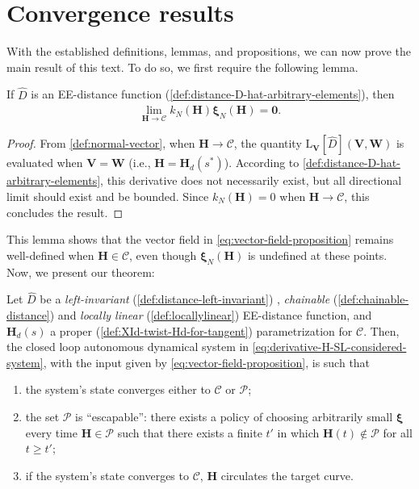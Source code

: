 \section{Convergence results}
\label{subs:conv-result}
With the established definitions, lemmas, and propositions, we can now prove the main result of this text. To do so, we first require the following lemma.

\begin{lemma} \label{lemma:xiNvanishing} If $\widehat{D}$ is an EE-distance function (\cref{def:distance-D-hat-arbitrary-elements}), then 
    \begin{align}
        \lim_{\mathbf{H} \rightarrow \mathcal{C}} k_N(\mathbf{H}) \boldsymbol{\xi}_N(\mathbf{H}) = \mathbf{0}.
    \end{align}
\end{lemma}
\begin{proof}
    From \cref{def:normal-vector}, when $\mathbf{H} \rightarrow \mathcal{C}$, the quantity $\text{L}_{\mathbf{V}}[\widehat{D}](\mathbf{V},\mathbf{W})$ is evaluated when $\mathbf{V} = \mathbf{W}$ (i.e., $\mathbf{H} = \mathbf{H}_d(s^*)$). According to \cref{def:distance-D-hat-arbitrary-elements}, this derivative does not necessarily exist, but all directional limit should exist and be bounded. Since $k_N(\mathbf{H}) = 0$ when $\mathbf{H} \rightarrow \mathcal{C}$, this concludes the result. 
\end{proof}
This lemma shows that the vector field in \eqref{eq:vector-field-proposition} remains well-defined when $\mathbf{H} \in \mathcal{C}$, even though $\boldsymbol{\xi}_N(\mathbf{H})$ is undefined at these points. Now, we present our theorem:
\begin{theorem}\label{thm:convergence-vector-field}
    Let $\widehat{D}$ be a \emph{left-invariant} (\cref{def:distance-left-invariant}) , \emph{chainable} (\cref{def:chainable-distance}) and \emph{locally linear} (\cref{def:locallylinear}) EE-distance function, and $\mathbf{H}_d(s)$ a proper (\cref{def:XId-twist-Hd-for-tangent}) parametrization for $\mathcal{C}$. Then, the closed loop autonomous dynamical system in  \eqref{eq:derivative-H-SL-considered-system}, with the input given by  \eqref{eq:vector-field-proposition}, is such that 
    \begin{enumerate}[label=(\roman*)]
        \item the system's state converges either to $\mathcal{C}$ or $\mathcal{P}$;
        \item the set $\mathcal{P}$ is ``escapable'': there exists a policy of choosing arbitrarily small $\boldsymbol{\xi}$ every time $\mathbf{H} \in \mathcal{P}$ such that there exists a finite $t'$ in which $\mathbf{H}(t) \not \in \mathcal{P}$ for all $t \geq t'$;
        \item if the system's state converges to  $\mathcal{C}$, $\mathbf{H}$ circulates the target curve.
    \end{enumerate}
\end{theorem}
